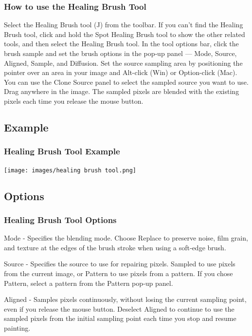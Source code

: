 \documentclass{beamer}
\begin{document}
\begin{frame}
	\frametitle{How to use the Healing Brush Tool}
	\begin{outline}
		\1 Select the Healing Brush tool (J) from the toolbar. 
		\2 If you can’t find the Healing Brush tool, click and hold the Spot Healing Brush tool to show the other related tools, and then select the Healing Brush tool.
		\1 In the tool options bar, click the brush sample and set the brush options in the pop‑up panel — Mode, Source, Aligned, Sample, and Diffusion.
		\1 Set the source sampling area by positioning the pointer over an area in your image and Alt-click (Win) or Option-click (Mac).
		\2 You can use the Clone Source panel to select the sampled source you want to use.
		\1 Drag anywhere in the image. The sampled pixels are blended with the existing pixels each time you release the mouse button.
	\end{outline}
\end{frame}

\subsection{Example}		
\begin{frame}
	\frametitle{Healing Brush Tool Example}
	\begin{center}
	\texttt{[image: images/healing brush tool.png]}
	\end{center}
\end{frame}

			\subsection{Options}		
			\begin{frame}
				\frametitle{Healing Brush Tool Options}
				\begin{outline}
					\1 Mode - 
					\2 Specifies the blending mode. Choose Replace to preserve noise, film grain, and texture at the edges of the brush stroke when using a soft‑edge brush.
					
					\1 Source - 
					\2 Specifies the source to use for repairing pixels. 
					\2 Sampled to use pixels from the current image, or Pattern to use pixels from a pattern. 
					\2 If you chose Pattern, select a pattern from the Pattern pop‑up panel.
					
					\1 Aligned - 
					\2 Samples pixels continuously, without losing the current sampling point, even if you release the mouse button. 
					\2 Deselect Aligned to continue to use the sampled pixels from the initial sampling point each time you stop and resume painting.
				\end{outline}
			\end{frame}
\end{document}
